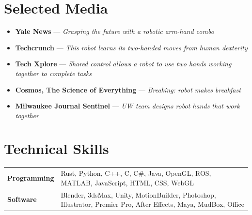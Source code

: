 \documentclass[10pt, letterpaper]{article}
\begin{document}
\section*{Selected Media}
\begin{itemize}[leftmargin=0pt, label={}, itemsep=0.5em]
    \item \textbf{Yale News} --- \textit{Grasping the future with a robotic arm-hand combo}
    \item \textbf{Techcrunch} --- \textit{This robot learns its two-handed moves from human dexterity}
    \item \textbf{Tech Xplore} --- \textit{Shared control allows a robot to use two hands working together to complete tasks}
    \item \textbf{Cosmos, The Science of Everything} --- \textit{Breaking: robot makes breakfast}
    \item \textbf{Milwaukee Journal Sentinel} --- \textit{UW team designs robot hands that work together}
\end{itemize}

\section*{Technical Skills}
\begin{longtable}{@{} p{2.5cm} p{\dimexpr\textwidth-3cm\relax} @{}}
\textbf{Programming} & Rust, Python, C++, C, C\#, Java, OpenGL, ROS, MATLAB, JavaScript, HTML, CSS, WebGL \\[0.2em]
\textbf{Software} & Blender, 3dsMax, Unity, MotionBuilder, Photoshop, Illustrator, Premier Pro, After Effects, Maya, MudBox, Office \\[0.2em]
\end{longtable}
\end{document}

